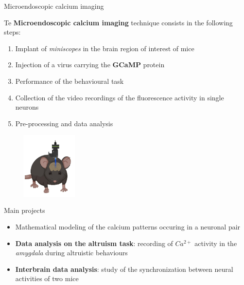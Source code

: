 \documentclass{beamer}
\begin{document}
\begin{frame}{Microendoscopic calcium imaging}



Te \textbf{Microendoscopic calcium imaging} technique consists in the following steps:

\begin{enumerate}
	
	\item Implant of \textit{miniscopes} in the brain region of interest of mice
	
	\item Injection of a virus carrying the \textbf{GCaMP} protein
	
	\item Performance of the behavioural task
	
	\item Collection of the video recordings of the fluorescence activity in single neurons
	
	\item Pre-processing and data analysis
\end{enumerate}

\begin{figure}[H]
	
	\centering
	\includegraphics[width=0.25\textwidth]{inscopix}
	
\end{figure}
\end{frame}


\begin{frame}{Main projects}
\begin{itemize}
	\item Mathematical modeling of the calcium patterns occuring in a neuronal pair
	\vspace{0.5cm}
	\item \textbf{ Data analysis on the altruism task}: recording of $Ca^{2+}$ activity in the \textit{amygdala} during altruistic behaviours
	\vspace{0.5cm}
	\item \textbf{ Interbrain data analysis}: study of the synchronization between  neural activities of two mice

	
\end{itemize}
\end{frame}
\end{document}
